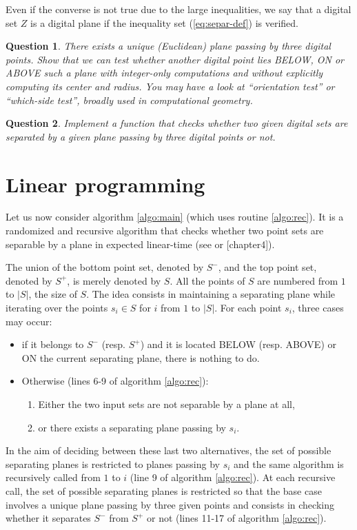 \documentclass[a4paper, 11pt]{article}
\newtheorem{qu}{Question}
\begin{document}
Even if the converse is not true due to the large inequalities, we say that a digital set $Z$ is 
a digital plane if the inequality set (\ref{eq:separ-def}) is verified.

\begin{qu}
There exists a unique (Euclidean) plane passing by three digital points. Show that we can test whether another digital
point lies BELOW, ON or ABOVE such a plane with integer-only computations and without explicitly computing 
its center and radius. You may have a look at ``orientation test'' or ``which-side test'', broadly used in computational geometry. 
\end{qu}

\begin{qu}
Implement a function that checks whether two given digital sets are separated by a given plane passing by three
digital points or not.  
\end{qu}

\section{Linear programming}

Let us now consider algorithm \ref{algo:main} (which uses routine \ref{algo:rec}). 
It is a randomized and recursive algorithm that checks whether two point sets
 are separable by a plane in expected linear-time (see \cite{Seidel1991} or \cite{Berg2000}[chapter4]). 

The union of the bottom point set, denoted by $S^-$, and the top point set, denoted by $S^+$, is 
merely denoted by $S$. All the points of $S$ are numbered from $1$ to $|S|$, the size of $S$.    
The idea consists in maintaining a separating plane while iterating over the points $s_i \in S$ 
for $i$ from $1$ to $|S|$. 
For each point $s_i$, three cases may occur:  
\begin{itemize}
 \item if it belongs to $S^-$ (resp. $S^+$) and it is located BELOW (resp. ABOVE) or ON 
the current separating plane, there is nothing to do. 
 \item Otherwise (lines 6-9 of algorithm \ref{algo:rec}): 
 \begin{enumerate}
   \item Either the two input sets are not separable by a plane at all,  
   \item or there exists a separating plane passing by $s_i$. 
 \end{enumerate}
\end{itemize}
In the aim of deciding between these last two alternatives, the set of possible separating 
planes is restricted to planes passing by $s_i$ and the same algorithm is recursively called
from $1$ to $i$ (line 9 of algorithm \ref{algo:rec}). 
At each recursive call, the set of possible separating planes is restricted so that the base case 
involves a unique plane passing by three given points and consists in checking whether it separates 
$S^-$ from $S^+$ or not (lines 11-17 of algorithm \ref{algo:rec}).  
\end{document}
